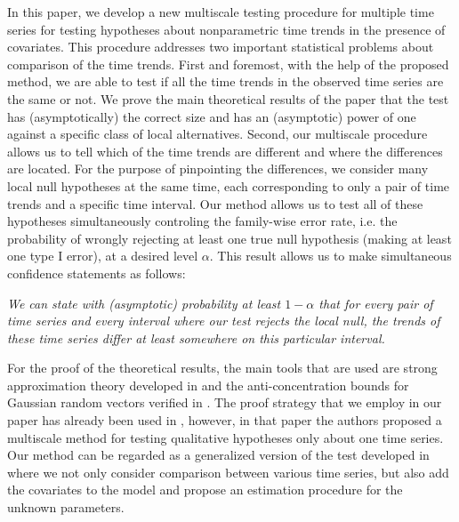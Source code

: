 \documentclass[a4paper,12pt]{article}
\begin{document}
In this paper, we develop a new multiscale testing procedure for multiple time series for testing hypotheses about nonparametric time trends in the presence of covariates. This procedure addresses two important statistical problems about comparison of the time trends. First and foremost, with the help of the proposed method, we are able to test if all the time trends in the observed time series are the same or not. We prove the main theoretical results of the paper that the test has (asymptotically) the correct size and has an (asymptotic) power of one against a specific class of local alternatives. Second, our multiscale procedure allows us to tell which of the time trends are different and where the differences are located. For the purpose of pinpointing the differences, we consider many local null hypotheses at the same time, each corresponding to only a pair of time trends and a specific time interval. Our method allows us to test all of these hypotheses simultaneously controling the family-wise error rate, i.e. the probability of wrongly rejecting at least one true null hypothesis (making at least one type I error), at a desired level $\alpha$. This result allows us to make simultaneous confidence statements as follows: 

\begin{center}
\begin{minipage}[c][1.75cm][c]{14cm}
\textit{We can state with (asymptotic) probability at least $1-\alpha$ that for every pair of time series and every interval where our test rejects the local null, the trends of these time series differ at least somewhere on this particular interval.}
\end{minipage}
\end{center}

For the proof of the theoretical results, the main tools that are used are strong approximation theory developed in \cite{BerkesLiuWu2014} and the anti-concentration bounds for Gaussian random vectors verified in \cite{Chernozhukov2015}. The proof strategy that we employ in our paper has already been used in \cite{KhismatullinaVogt2020}, however, in that paper the authors proposed a multiscale method for testing qualitative hypotheses only about one time series. Our method can be regarded as a generalized version of the test developed in \cite{KhismatullinaVogt2020} where we not only consider comparison between various time series, but also add the covariates to the model and propose an estimation procedure for the unknown parameters.
\end{document}

